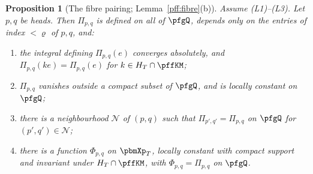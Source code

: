 \documentclass[10pt]{amsart}
\newtheorem{proposition}[theorem]{Proposition}
\theoremstyle{definition}
\theoremstyle{remark}
\begin{document}
\begin{proposition}[The fibre pairing; Lemma~\ref{pff:fibre}(b)]\label{pfg:fibrepairing}
Assume (L1)--(L3). Let $p,q$ be heads. Then $\Pi_{p,q}$ is defined on all of $\pfgQ$, depends only on the entries of index
$<\varrho$ of $p,q$, and:
\begin{enumerate}
\item[(a)] the integral defining $\Pi_{p,q}(e)$ converges absolutely, and $\Pi_{p,q}(ke)=\Pi_{p,q}(e)$ for $k\in H_T\cap\pffKM$;
\item[(b)] $\Pi_{p,q}$ vanishes outside a compact subset of $\pfgQ$, and is locally constant on $\pfgQ$;
\item[(c)] there is a neighbourhood $\mathcal N$ of $(p,q)$ such that $\Pi_{p',q'}=\Pi_{p,q}$ on $\pfgQ$ for $(p',q')\in\mathcal N$;
\item[(d)] there is a function $\Phi_{p,q}$ on $\pbmXp_T$, locally constant with compact support and invariant under $H_T\cap
\pffKM$, with $\Phi_{p,q}=\Pi_{p,q}$ on $\pfgQ$.
\end{enumerate}
\end{proposition}
\end{document}
